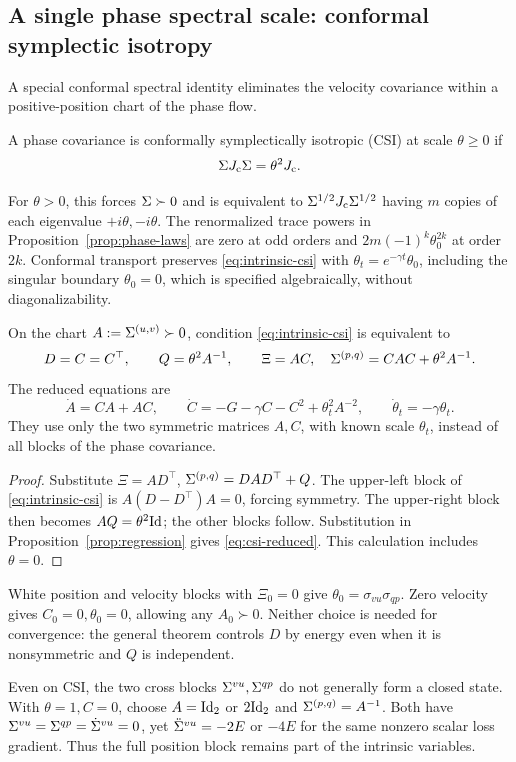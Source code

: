 \subsection{A single phase spectral scale: conformal symplectic isotropy}
A special conformal spectral identity eliminates the velocity covariance
within a positive-position chart of the phase flow.
\begin{definition}\label{def:csi}
A phase covariance is conformally symplectically isotropic (CSI) at
scale \(\theta\ge0\) if
\begin{equation}\label{eq:intrinsic-csi}
 \Sigma J_{\mathrm c}\Sigma=\theta^2J_{\mathrm c}.
\end{equation}
\end{definition}
For $\theta>0$, this forces $\Sigma\succ0$ and is equivalent to
$\Sigma^{1/2}J_{\mathrm c}\Sigma^{1/2}$ having $m$ copies of each eigenvalue
$+i\theta,-i\theta$.
The renormalized trace powers in Proposition~\ref{prop:phase-laws}
are zero at odd orders and $2m(-1)^k\theta_0^{2k}$ at order $2k$.
Conformal transport preserves \eqref{eq:intrinsic-csi} with
$\theta_t=e^{-\gamma t}\theta_0$, including the singular boundary
$\theta_0=0$, which is specified algebraically, without diagonalizability.

\begin{proposition}\label{prop:intrinsic-csi}
On the chart \(A:=\Sigma^{(u,v)}\succ0\), condition \eqref{eq:intrinsic-csi}
is equivalent to
\[
 D=C=C^\top,\qquad Q=\theta^2A^{-1},
 \qquad \Xi=AC,\quad \Sigma^{(p,q)}=CAC+\theta^2A^{-1}.
\]
The reduced equations are
\begin{equation}\label{eq:csi-reduced}
 \dot A=CA+AC,\qquad
 \dot C=-G-\gamma C-C^2+\theta_t^2A^{-2},
 \qquad\dot\theta_t=-\gamma\theta_t.
\end{equation}
They use only the two symmetric matrices \(A,C\), with known scale
\(\theta_t\), instead of all blocks of the phase covariance.
\end{proposition}
\begin{proof}
Substitute \(\Xi=AD^\top\), \(\Sigma^{(p,q)}=DAD^\top+Q\).
The upper-left block of \eqref{eq:intrinsic-csi} is
\(A(D-D^\top)A=0\), forcing symmetry.
The upper-right block then becomes \(AQ=\theta^2\mathrm{Id}\);
the other blocks follow.
Substitution in Proposition~\ref{prop:regression} gives
\eqref{eq:csi-reduced}. This calculation includes \(\theta=0\).
\end{proof}
White position and velocity blocks with \(\Xi_0=0\) give
\(\theta_0=\sigma_{vu}\sigma_{qp}\). Zero velocity gives
\(C_0=0,\theta_0=0\), allowing any \(A_0\succ0\).
Neither choice is needed for convergence: the general theorem controls
\(D\) by energy even when it is nonsymmetric and \(Q\) is independent.

\begin{remark}
Even on CSI, the two cross blocks \(\Sigma^{vu},\Sigma^{qp}\) do not generally form a
closed state. With \(\theta=1,C=0\), choose \(A=\mathrm{Id}_2\) or \(2\mathrm{Id}_2\)
and \(\Sigma^{(p,q)}=A^{-1}\). Both have
\(\Sigma^{vu}=\Sigma^{qp}=\dot{\Sigma}^{vu}=0\), yet
\(\ddot{\Sigma}^{vu}=-2E\) or \(-4E\) for the same nonzero scalar loss gradient.
Thus the full position block remains part of the intrinsic variables.
\end{remark}
